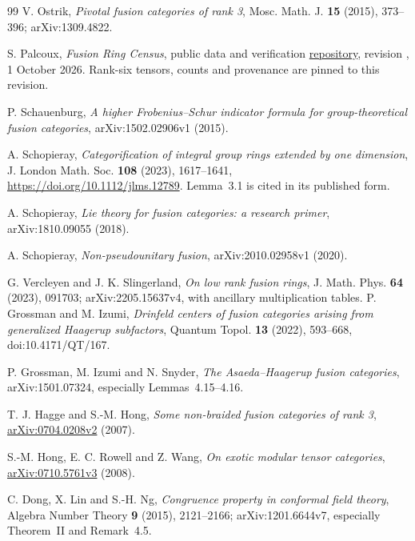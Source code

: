 \begin{thebibliography}{99}
V. Ostrik, \emph{Pivotal fusion categories of rank 3}, Mosc. Math. J. \textbf{15} (2015), 373--396; arXiv:1309.4822.

S. Palcoux, \emph{Fusion Ring Census}, public data and verification \href{https://github.com/sebastienpalcoux/fusion-ring-census}{repository}, revision , 1 October 2026. Rank-six tensors, counts and provenance are pinned to this revision.

P. Schauenburg, \emph{A higher Frobenius--Schur indicator formula for group-theoretical fusion categories}, arXiv:1502.02906v1 (2015).

A. Schopieray, \emph{Categorification of integral group rings extended by one dimension}, J. London Math. Soc. \textbf{108} (2023), 1617--1641, \url{https://doi.org/10.1112/jlms.12789}. Lemma~3.1 is cited in its published form.

A. Schopieray, \emph{Lie theory for fusion categories: a research primer}, arXiv:1810.09055 (2018).

A. Schopieray, \emph{Non-pseudounitary fusion}, arXiv:2010.02958v1 (2020).

G. Vercleyen and J. K. Slingerland, \emph{On low rank fusion rings}, J. Math. Phys. \textbf{64} (2023), 091703; arXiv:2205.15637v4, with ancillary multiplication tables.
P. Grossman and M. Izumi,
\emph{Drinfeld centers of fusion categories arising from generalized Haagerup subfactors},
Quantum Topol. \textbf{13} (2022), 593--668, doi:10.4171/QT/167.

P. Grossman, M. Izumi and N. Snyder,
\emph{The Asaeda--Haagerup fusion categories}, arXiv:1501.07324,
especially Lemmas~4.15--4.16.

T. J. Hagge and S.-M. Hong,
\emph{Some non-braided fusion categories of rank 3},
\href{https://arxiv.org/abs/0704.0208v2}{arXiv:0704.0208v2} (2007).

S.-M. Hong, E. C. Rowell and Z. Wang,
\emph{On exotic modular tensor categories},
\href{https://arxiv.org/abs/0710.5761v3}{arXiv:0710.5761v3} (2008).

C. Dong, X. Lin and S.-H. Ng, \emph{Congruence property in conformal field theory}, Algebra Number Theory \textbf{9} (2015), 2121--2166; arXiv:1201.6644v7, especially Theorem~II and Remark~4.5.


\end{thebibliography}
